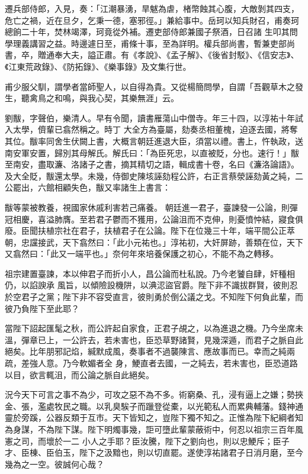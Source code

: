 \begin{pinyinscope}
 遷兵部侍郎，入見，奏：「江潮暴湧，旱魃為虐，楮幣蝕其心腹，大敵剝其四支，危亡之禍，近在旦夕，乞秉一德，塞邪徑。」兼給事中。岳珂以知兵財召，甫奏珂總餉二十年，焚林竭澤，珂竟從外補。遷吏部侍郎兼國子祭酒，日召諸
 生叩其問學理義講習之益。時邊遽日至，甫條十事，至為詳明。權兵部尚書，暫兼吏部尚書，卒，贈通奉大夫，謚正肅。有《孝說》、《孟子解》、《後省封駁》、《信安志》、《江東荒政錄》、《防拓錄》、《樂事錄》及文集行世。



 甫少服父馴，謂學者當師聖人，以自得為貴。又從楊簡問學，自謂「吾觀草木之發生，聽禽鳥之和鳴，與我心契，其樂無涯」云。



 劉黻，字聲伯，樂清人。早有令聞，讀書雁蕩山中僧寺。年三十四，以淳祐十年試入太學，儕輩已翕然稱之。時丁
 大全方為臺屬，劾奏丞相董槐，迫逐去國，將奪其位。黻率同舍生伏闕上書，大概言朝廷進退大臣，須當以禮。書上，忤執政，送南安軍安置，歸別其母解氏。解氏曰：「為臣死忠，以直被貶，分也。速行！」黻至南安，盡取濂、洛諸子之書，摘其精切之語，輯成書十卷，名曰《濂洛論語》。及大全貶，黻還太學。未幾，侍御史陳垓誣劾程公許，右正言蔡滎誣劾黃之純，二公罷出，六館相顧失色，黻又率諸生上書言：



 黻等蒙被教養，視國家休戚利害若己痛養。
 朝廷進一君子，臺諫發一公論，則彈冠相慶，喜溢肺膺。至若君子鬱而不獲用，公論沮而不克伸，則憂憤忡結，寢食俱廢。臣聞扶植宗社在君子，扶植君子在公論。陛下在位幾三十年，端平間公正萃朝，忠讜接武，天下翕然曰：「此小元祐也。」淳祐初，大奸屏跡，善類在位，天下又翕然曰：「此又一端平也。」奈何年來培養保護之初心，不能不為之轉移。



 祖宗建置臺諫，本以伸君子而折小人，昌公論而杜私說。乃今老饕自肆，奸種相仍，以諂諛承
 風旨，以傾險設機阱，以淟涊盜官爵。陛下非不識拔群賢，彼則忍於空君子之黨；陛下非不容受直言，彼則勇於倒公議之戈。不知陛下何負此輩，而彼乃負陛下至此耶？



 當陛下詔起匯髦之秋，而公許起自家食，正君子覘之，以為進退之機。乃今坐席未溫，彈章已上，一公許去，若未害也，臣恐草野諸賢，見幾深遁，而君子之脈自此絕矣。比年朋邪記焰，緘默成風，奏事者不過襲陳言、應故事而已。幸而之純兩疏，差強人意。乃今軟媚者全
 身，鯁直者去國，一之純去，若未害也，臣恐道路以目，欲言輒沮，而公論之脈自此絕矣。



 況今天下可言之事不為少，可攻之惡不為不多。術窮桑、孔，浸有逼上之嫌；勢挾金、張，濫處牧民之職。以乳臭騃子而躐登從橐，以光範私人而累典輔藩。錢神通靈於旁蹊，公器反類于互市。天下皆知之，豈陛下獨不知之。正惟為陛下紀綱者知為身謀，不為陛下謀。陛下明燭事幾，詎可墮此輩蒙蔽術中，何忍以祖宗三百年風憲之司，而壞於一二
 小人之手耶？臣汝騰，陛下之劉向也，則以忠鯁斥；臣子才、臣棟、臣伯玉，陛下之汲黯也，則以切直罷。遂使淳祐諸君子日消月磨，至今幾為之一空。彼誠何心哉？




\end{pinyinscope}
